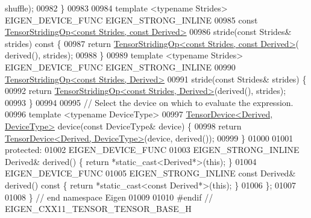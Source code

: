 \begin{DoxyCode}
      shuffle);
00982     \}
00983 
00984     \textcolor{keyword}{template} <\textcolor{keyword}{typename} Str\textcolor{keywordtype}{id}es> EIGEN\_DEVICE\_FUNC EIGEN\_STRONG\_INLINE
00985     \textcolor{keyword}{const} \hyperlink{class_eigen_1_1_tensor_striding_op}{TensorStridingOp<const Strides, const Derived>}
00986     stride(\textcolor{keyword}{const} Strides& strides)\textcolor{keyword}{ const }\{
00987       \textcolor{keywordflow}{return} \hyperlink{class_eigen_1_1_tensor_striding_op}{TensorStridingOp<const Strides, const Derived>}(
      derived(), strides);
00988     \}
00989     \textcolor{keyword}{template} <\textcolor{keyword}{typename} Str\textcolor{keywordtype}{id}es> EIGEN\_DEVICE\_FUNC EIGEN\_STRONG\_INLINE
00990     \hyperlink{class_eigen_1_1_tensor_striding_op}{TensorStridingOp<const Strides, Derived>}
00991     stride(\textcolor{keyword}{const} Strides& strides) \{
00992       \textcolor{keywordflow}{return} \hyperlink{class_eigen_1_1_tensor_striding_op}{TensorStridingOp<const Strides, Derived>}(derived(), 
      strides);
00993     \}
00994 
00995     \textcolor{comment}{// Select the device on which to evaluate the expression.}
00996     \textcolor{keyword}{template} <\textcolor{keyword}{typename} DeviceType>
00997     \hyperlink{class_eigen_1_1_tensor_device}{TensorDevice<Derived, DeviceType>} device(\textcolor{keyword}{const} DeviceType& device) \{
00998       \textcolor{keywordflow}{return} \hyperlink{class_eigen_1_1_tensor_device}{TensorDevice<Derived, DeviceType>}(device, derived());
00999     \}
01000 
01001  \textcolor{keyword}{protected}:
01002     EIGEN\_DEVICE\_FUNC
01003     EIGEN\_STRONG\_INLINE Derived& derived() \{ \textcolor{keywordflow}{return} *\textcolor{keyword}{static\_cast<}Derived*\textcolor{keyword}{>}(\textcolor{keyword}{this}); \}
01004     EIGEN\_DEVICE\_FUNC
01005     EIGEN\_STRONG\_INLINE \textcolor{keyword}{const} Derived& derived()\textcolor{keyword}{ const }\{ \textcolor{keywordflow}{return} *\textcolor{keyword}{static\_cast<}\textcolor{keyword}{const }Derived*\textcolor{keyword}{>}(\textcolor{keyword}{this}); \}
01006 \};
01007 
01008 \} \textcolor{comment}{// end namespace Eigen}
01009 
01010 \textcolor{preprocessor}{#endif // EIGEN\_CXX11\_TENSOR\_TENSOR\_BASE\_H}
\end{DoxyCode}
